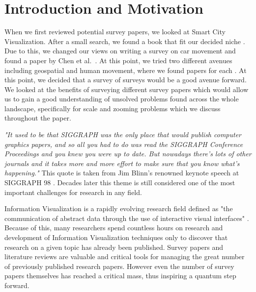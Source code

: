 \section{Introduction and Motivation}
When we first reviewed potential survey papers, we looked at Smart City Visualization. After a small search, we found a book that fit our decided niche \cite{ciuccarelli2014depicting}. Due to this, we changed our views on writing a survey on car movement and found a paper by Chen et al.\ \cite{chen2015survey}. At this point, we tried two different avenues including geospatial and human movement, where we found papers for each \cite{nusrat2016state,gavrila1999visual}. At this point, we decided that a survey of surveys would be a good avenue forward. We looked at the benefits of surveying different survey papers which would allow us to gain a good understanding of unsolved problems found across the whole landscape, specifically for scale and zooming problems which we discuss throughout the paper.


\textit{"It used to be that SIGGRAPH was the only place that would publish computer graphics papers, and so all you had to do was read the SIGGRAPH Conference Proceedings and you knew you were up to date. But nowadays there's lots of other journals and it takes more and more effort to make sure that you know what's happening."} This quote is taken from Jim Blinn's renowned keynote speech at SIGGRAPH 98 \cite{blinn1998ten}. Decades later this theme is still considered one of the most important challenges for research in any field.

 Information Visualization is a rapidly evolving research field defined as "the communication of abstract data through the use of interactive visual interfaces" \cite{keim2006challenges}. Because of this, many researchers spend countless hours on research and development of Information Visualization techniques only to discover that research on a given topic has already been published. Survey papers and literature reviews are valuable and critical tools for managing the great number of previously published research papers. However even the number of survey papers themselves has reached a critical mass, thus inspiring a quantum step forward.

